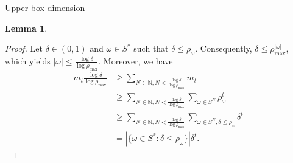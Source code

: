 \documentclass[12pt,oneside,reqno]{amsart}
\newtheorem{lemma}[theorem]{Lemma}
\theoremstyle{definition}
\theoremstyle{remark}
\begin{document}
\begin{subsection}{Upper box dimension}
\begin{lemma}
 \end{lemma}
 \begin{proof}
     Let $\delta \in (0,1)$ and $\omega \in S^*$ such that $\delta \le \rho_\omega.$ Consequently, $\delta \le \rho_{\max}^{|\omega|},$ which yields $|\omega| \le \frac{\log \delta}{\log \rho_{\max}}.$
     Moreover, we have 
     \begin{equation*}
         \begin{aligned}
             m_t \frac{\log \delta}{\log \rho_{\max}} &\ge \sum_{N \in \mathbb{N}, N < \frac{\log \delta}{\log \rho_{\max}}} m_t \\& \ge \sum_{N \in \mathbb{N}, N < \frac{\log \delta}{\log \rho_{\max}}} \sum_{\omega \in S^N} \rho_{\omega}^{t} \\& \ge \sum_{N \in \mathbb{N}, N < \frac{\log \delta}{\log \rho_{\max}}} \sum_{\omega \in S^N, \delta \le \rho_\omega} \delta^t \\& = |\{\omega \in S^* : \delta \le \rho_\omega\}| \delta^t.
         \end{aligned}
     \end{equation*}
    

\end{proof}
\end{subsection}
\end{document}
